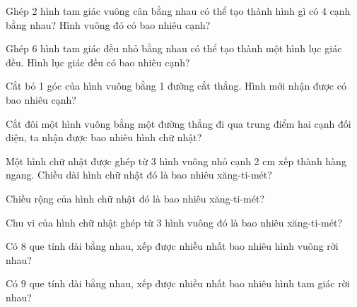 \begin{ex}
Ghép 2 hình tam giác vuông cân bằng nhau có thể tạo thành hình gì có 4 cạnh bằng nhau? Hình vuông đó có bao nhiêu cạnh?
\end{ex}

\begin{ex}
Ghép 6 hình tam giác đều nhỏ bằng nhau có thể tạo thành một hình lục giác đều. Hình lục giác đều có bao nhiêu cạnh?
\end{ex}

\begin{ex}
Cắt bỏ 1 góc của hình vuông bằng 1 đường cắt thẳng. Hình mới nhận được có bao nhiêu cạnh?
\end{ex}

\begin{ex}
Cắt đôi một hình vuông bằng một đường thẳng đi qua trung điểm hai cạnh đối diện, ta nhận được bao nhiêu hình chữ nhật?
\end{ex}

\begin{ex}
Một hình chữ nhật được ghép từ 3 hình vuông nhỏ cạnh 2 cm xếp thành hàng ngang. Chiều dài hình chữ nhật đó là bao nhiêu xăng-ti-mét?
\end{ex}

\begin{ex}
Chiều rộng của hình chữ nhật đó là bao nhiêu xăng-ti-mét?
\end{ex}

\begin{ex}
Chu vi của hình chữ nhật ghép từ 3 hình vuông đó là bao nhiêu xăng-ti-mét?
\end{ex}

\begin{ex}
Có 8 que tính dài bằng nhau, xếp được nhiều nhất bao nhiêu hình vuông rời nhau?
\end{ex}

\begin{ex}
Có 9 que tính dài bằng nhau, xếp được nhiều nhất bao nhiêu hình tam giác rời nhau?
\end{ex}

